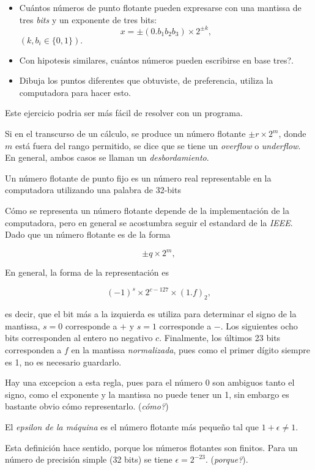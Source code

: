 \documentclass[spanish]{amsart}
\begin{document}
\begin{exercise}
  \begin{itemize}
  \item Cuántos números de punto flotante pueden expresarse con una mantissa de tres \emph{bits} y un exponente de tres bits:
\[x = \pm(0.b_1b_2b_3) \times 2^{\pm k},\]
$(k, b_i \in \{0, 1\}).$
\item Con hipotesis similares, cuántos números pueden escribirse en base tres?.
\item Dibuja los puntos diferentes que obtuviste, de preferencia, utiliza la computadora para hacer esto.
\end{itemize}
Este ejercicio podria ser más fácil de resolver con un programa.
\end{exercise}

\begin{definition}
Si en el transcurso de un cálculo, se produce un número flotante $\pm r \times 2^m$, donde $m$ está fuera del rango permitido, se dice que se tiene un \emph{overflow} o \emph{underflow}. En general, ambos casos se llaman un \emph{desbordamiento}.  
\end{definition}

\begin{definition}
  Un número flotante de punto fijo es un número real representable en la computadora utilizando una palabra de 32-bits
\end{definition}

Cómo se representa un número flotante depende de la implementación de la computadora, pero en general se acostumbra seguir el estandard de la \emph{IEEE}. Dado que un  número flotante es de la forma

\[\pm q \times 2^m,\]

En general, la forma de la representación es 

\[(-1)^s \times 2^{c - 127} \times (1.f)_2,\]

es decir, que el bit más a la izquierda es utiliza para determinar el signo de la mantissa, $s = 0$ corresponde a $+$ y $s = 1$ corresponde a $-$. Los siguientes ocho bits corresponden al entero  no negativo $c$. Finalmente, los últimos 23 bits corresponden a $f$ en la mantissa \emph{normalizada}, pues como el primer dígito siempre es 1, no es necesario guardarlo.

\begin{remark}
  Hay una excepcion a esta regla, pues para el número 0 son ambiguos tanto el signo, como el exponente y la mantissa no puede tener un 1, sin embargo es bastante obvio cómo representarlo. (\emph{cómo?})
\end{remark}

\begin{definition}
  El \emph{epsilon de la máquina} es el número flotante más pequeño tal que $1 + \epsilon \neq 1$.
\end{definition}

Esta definición hace sentido, porque los números flotantes son finitos. Para un número de precisión simple (32 bits) se tiene $\epsilon = 2^{-23}$. (\emph{porque?}).



\nocite{*}
{}

\end{document}

